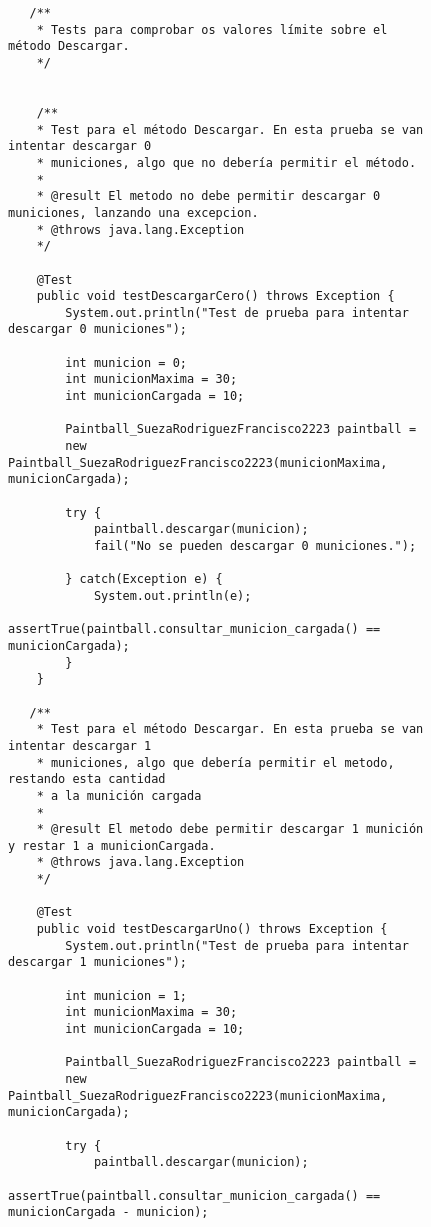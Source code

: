 \begin{figure}[H]
    \begin{tcolorbox}[sharp corners, colback=yellow!30, colframe=white!20]
        \tiny
        \begin{verbatim}
   /**
    * Tests para comprobar os valores límite sobre el método Descargar.
    */


    /**
    * Test para el método Descargar. En esta prueba se van intentar descargar 0
    * municiones, algo que no debería permitir el método.
    *
    * @result El metodo no debe permitir descargar 0 municiones, lanzando una excepcion.
    * @throws java.lang.Exception
    */

    @Test
    public void testDescargarCero() throws Exception {
        System.out.println("Test de prueba para intentar descargar 0 municiones");

        int municion = 0;
        int municionMaxima = 30;
        int municionCargada = 10;

        Paintball_SuezaRodriguezFrancisco2223 paintball =
        new Paintball_SuezaRodriguezFrancisco2223(municionMaxima, municionCargada);

        try {
            paintball.descargar(municion);
            fail("No se pueden descargar 0 municiones.");

        } catch(Exception e) {
            System.out.println(e);
            assertTrue(paintball.consultar_municion_cargada() == municionCargada);
        }
    }

   /**
    * Test para el método Descargar. En esta prueba se van intentar descargar 1
    * municiones, algo que debería permitir el metodo, restando esta cantidad
    * a la munición cargada
    *
    * @result El metodo debe permitir descargar 1 munición y restar 1 a municionCargada.
    * @throws java.lang.Exception
    */

    @Test
    public void testDescargarUno() throws Exception {
        System.out.println("Test de prueba para intentar descargar 1 municiones");

        int municion = 1;
        int municionMaxima = 30;
        int municionCargada = 10;

        Paintball_SuezaRodriguezFrancisco2223 paintball =
        new Paintball_SuezaRodriguezFrancisco2223(municionMaxima, municionCargada);

        try {
            paintball.descargar(municion);
            assertTrue(paintball.consultar_municion_cargada() == municionCargada - municion);


\end{verbatim}
\end{tcolorbox}
\end{figure}
